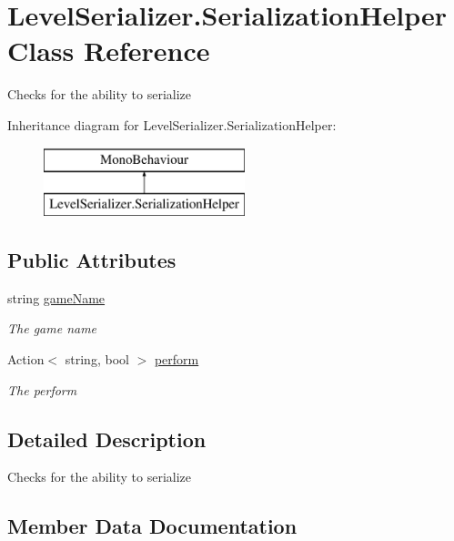 \hypertarget{class_level_serializer_1_1_serialization_helper}{}\section{Level\+Serializer.\+Serialization\+Helper Class Reference}
\label{class_level_serializer_1_1_serialization_helper}


Checks for the ability to serialize  


Inheritance diagram for Level\+Serializer.\+Serialization\+Helper\+:\begin{figure}[H]
\begin{center}
\leavevmode
\includegraphics[height=2.000000cm]{class_level_serializer_1_1_serialization_helper}
\end{center}
\end{figure}
\subsection*{Public Attributes}
\begin{DoxyCompactItemize}
\item 
string \hyperlink{class_level_serializer_1_1_serialization_helper_a96770e144e0d3109da4f1abc6e80809b}{game\+Name}
\begin{DoxyCompactList}\small\item\em The game name \end{DoxyCompactList}\item 
Action$<$ string, bool $>$ \hyperlink{class_level_serializer_1_1_serialization_helper_aa9def6ef5a0e2192b40464483a8ea057}{perform}
\begin{DoxyCompactList}\small\item\em The perform \end{DoxyCompactList}\end{DoxyCompactItemize}


\subsection{Detailed Description}
Checks for the ability to serialize 



\subsection{Member Data Documentation}
\mbox{\label{class_level_serializer_1_1_serialization_helper_a96770e144e0d3109da4f1abc6e80809b}} 
